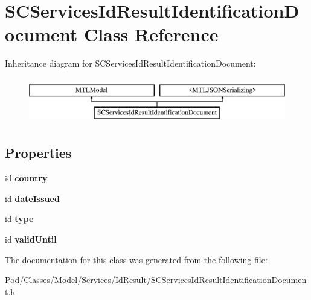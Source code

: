 \hypertarget{interface_s_c_services_id_result_identification_document}{}\section{S\+C\+Services\+Id\+Result\+Identification\+Document Class Reference}
\label{interface_s_c_services_id_result_identification_document}
Inheritance diagram for S\+C\+Services\+Id\+Result\+Identification\+Document\+:\begin{figure}[H]
\begin{center}
\leavevmode
\includegraphics[height=2.000000cm]{interface_s_c_services_id_result_identification_document}
\end{center}
\end{figure}
\subsection*{Properties}
\begin{DoxyCompactItemize}
\item 
id {\bfseries country}\hypertarget{interface_s_c_services_id_result_identification_document_afafc1ee5eabe363dbf644aec46e5638e}{}\label{interface_s_c_services_id_result_identification_document_afafc1ee5eabe363dbf644aec46e5638e}

\item 
id {\bfseries date\+Issued}\hypertarget{interface_s_c_services_id_result_identification_document_a67211025aa331b11bcb5f57bbd359ec4}{}\label{interface_s_c_services_id_result_identification_document_a67211025aa331b11bcb5f57bbd359ec4}

\item 
id {\bfseries type}\hypertarget{interface_s_c_services_id_result_identification_document_a98f500431d3f4978772ee528426b11b8}{}\label{interface_s_c_services_id_result_identification_document_a98f500431d3f4978772ee528426b11b8}

\item 
id {\bfseries valid\+Until}\hypertarget{interface_s_c_services_id_result_identification_document_a8cb525d9774e758b3e8fb195961ef493}{}\label{interface_s_c_services_id_result_identification_document_a8cb525d9774e758b3e8fb195961ef493}

\end{DoxyCompactItemize}


The documentation for this class was generated from the following file\+:\begin{DoxyCompactItemize}
\item 
Pod/\+Classes/\+Model/\+Services/\+Id\+Result/S\+C\+Services\+Id\+Result\+Identification\+Document.\+h\end{DoxyCompactItemize}
